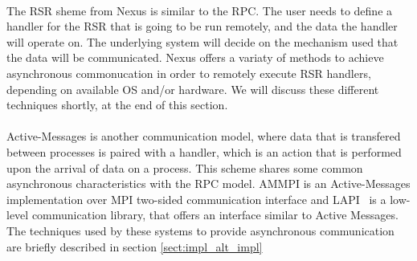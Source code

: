 \paragraph{}
The RSR sheme from Nexus\cite{Foster96thenexus} is similar to the RPC. The user needs to define a handler for the 
RSR that is going to be run remotely, and the data the handler will operate on.  The underlying system will decide
on the mechanism used that the data will be communicated.  Nexus offers a variaty of methods to achieve asynchronous
commonucation in order to remotely execute RSR handlers, depending on available OS and/or hardware.  
We will discuss these different techniques shortly, at the end of this section. 

\paragraph{}
Active-Messages is another communication model, where data that is transfered between processes is paired with 
a handler, which is an action that is performed upon the arrival of data on a process.  This scheme shares some common
asynchronous characteristics with the RPC model. 
AMMPI\cite{Bonachea:ammpi} is an Active-Messages implementation over MPI two-sided communication
interface and LAPI~\cite{Shah:1998:PEL:876880.879642} is a low-level communication library, that offers an interface
similar to Active Messages.  
The techniques used by these systems to provide asynchronous communication are briefly described in
section \ref{sect:impl_alt_impl}

